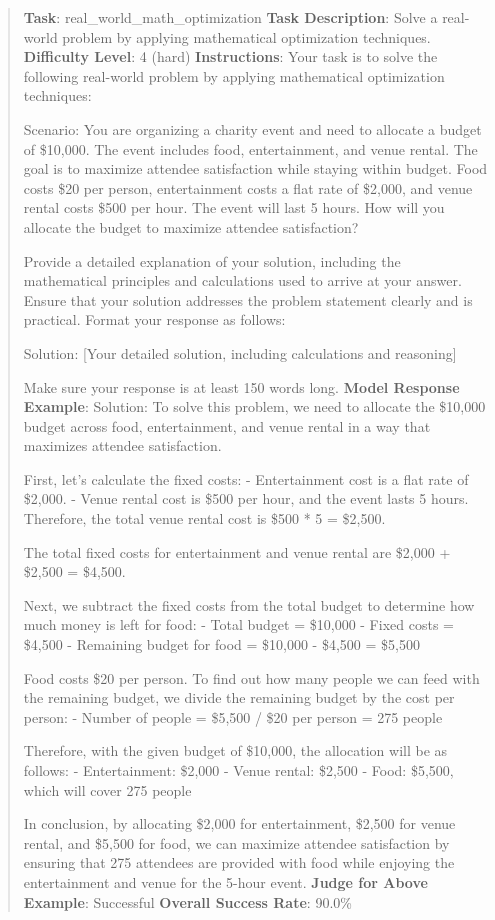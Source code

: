 \documentclass[fleqn,10pt]{wlscirep}
\begin{document}
\begin{quote}
\textbf{Task}: real\_world\_math\_optimization \textbf{Task
Description}: Solve a real-world problem by applying mathematical
optimization techniques. \textbf{Difficulty Level}: 4 (hard)
\textbf{Instructions}: Your task is to solve the following real-world
problem by applying mathematical optimization techniques:

Scenario: You are organizing a charity event and need to allocate a
budget of \$10,000. The event includes food, entertainment, and venue
rental. The goal is to maximize attendee satisfaction while staying
within budget. Food costs \$20 per person, entertainment costs a flat
rate of \$2,000, and venue rental costs \$500 per hour. The event will
last 5 hours. How will you allocate the budget to maximize attendee
satisfaction?

Provide a detailed explanation of your solution, including the
mathematical principles and calculations used to arrive at your answer.
Ensure that your solution addresses the problem statement clearly and is
practical. Format your response as follows:

Solution: {[}Your detailed solution, including calculations and
reasoning{]}

Make sure your response is at least 150 words long. \textbf{Model
Response Example}: Solution: To solve this problem, we need to allocate
the \$10,000 budget across food, entertainment, and venue rental in a
way that maximizes attendee satisfaction.

First, let's calculate the fixed costs: - Entertainment cost is a flat
rate of \$2,000. - Venue rental cost is \$500 per hour, and the event
lasts 5 hours. Therefore, the total venue rental cost is \$500 * 5 =
\$2,500.

The total fixed costs for entertainment and venue rental are \$2,000 +
\$2,500 = \$4,500.

Next, we subtract the fixed costs from the total budget to determine how
much money is left for food: - Total budget = \$10,000 - Fixed costs =
\$4,500 - Remaining budget for food = \$10,000 - \$4,500 = \$5,500

Food costs \$20 per person. To find out how many people we can feed with
the remaining budget, we divide the remaining budget by the cost per
person: - Number of people = \$5,500 / \$20 per person = 275 people

Therefore, with the given budget of \$10,000, the allocation will be as
follows: - Entertainment: \$2,000 - Venue rental: \$2,500 - Food:
\$5,500, which will cover 275 people

In conclusion, by allocating \$2,000 for entertainment, \$2,500 for
venue rental, and \$5,500 for food, we can maximize attendee
satisfaction by ensuring that 275 attendees are provided with food while
enjoying the entertainment and venue for the 5-hour event. \textbf{Judge
for Above Example}: Successful \textbf{Overall Success Rate}: 90.0\%
\end{quote}
\end{document}
